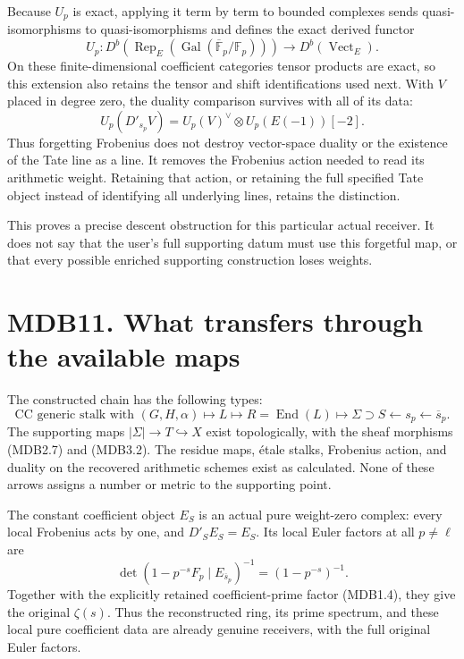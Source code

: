 \documentclass[
]{report}
\begin{document}
Because \(U_p\) is exact, applying it term by term to bounded complexes
sends quasi-isomorphisms to quasi-isomorphisms and defines the exact
derived functor \[
U_p:D^b\!\left(\operatorname{Rep}_{E}(\operatorname{Gal}(\overline{\mathbb F}_p/\mathbb F_p))\right)
\longrightarrow D^b(\operatorname{Vect}_{E}).
\tag{MDB10.3a}
\] On these finite-dimensional coefficient categories tensor products
are exact, so this extension also retains the tensor and shift
identifications used next. With \(V\) placed in degree zero, the duality
comparison survives with all of its data: \[
U_p(D'_{s_p}V)
=U_p(V)^\vee\otimes U_p(E(-1))[-2].
\tag{MDB10.4}
\] Thus forgetting Frobenius does not destroy vector-space duality or
the existence of the Tate line as a line. It removes the Frobenius
action needed to read its arithmetic weight. Retaining that action, or
retaining the full specified Tate object instead of identifying all
underlying lines, retains the distinction.

This proves a precise descent obstruction for this particular actual
receiver. It does not say that the user's full supporting datum must use
this forgetful map, or that every possible enriched supporting
construction loses weights.

\section{MDB11. What transfers through the available
maps}\label{mdb11.-what-transfers-through-the-available-maps}

The constructed chain has the following types: \[
\text{CC generic stalk with }(G,H,\alpha)
\longmapsto L
\longmapsto R=\operatorname{End}(L)
\longmapsto\Sigma
\supset S
\longleftarrow s_p
\longleftarrow\overline s_p.
\tag{MDB11.1}
\] The supporting maps \(|\Sigma|\to T\hookrightarrow X\) exist
topologically, with the sheaf morphisms (MDB2.7) and (MDB3.2). The
residue maps, étale stalks, Frobenius action, and duality on the
recovered arithmetic schemes exist as calculated. None of these arrows
assigns a number or metric to the supporting point.

The constant coefficient object \(E_S\) is an actual pure weight-zero
complex: every local Frobenius acts by one, and \(D'_SE_S=E_S\). Its
local Euler factors at all \(p\neq\ell\) are \[
\det(1-p^{-s}F_p\mid E_{\overline s_p})^{-1}
=(1-p^{-s})^{-1}.
\tag{MDB11.2}
\] Together with the explicitly retained coefficient-prime factor
(MDB1.4), they give the original \(\zeta(s)\). Thus the reconstructed
ring, its prime spectrum, and these local pure coefficient data are
already genuine receivers, with the full original Euler factors.
\end{document}
